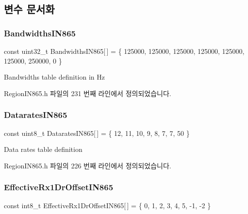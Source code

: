 \subsection{변수 문서화}
\mbox{\label{group___r_e_g_i_o_n_i_n865_ga475d37a30ba7948399a698e9ed6b8dc1}} 
\subsubsection{\texorpdfstring{Bandwidths\+I\+N865}{BandwidthsIN865}}
{\footnotesize\ttfamily const uint32\+\_\+t Bandwidths\+I\+N865\mbox{[}$\,$\mbox{]} = \{ 125000, 125000, 125000, 125000, 125000, 125000, 250000, 0 \}\hspace{0.3cm}{\ttfamily [static]}}

Bandwidths table definition in Hz 

Region\+I\+N865.\+h 파일의 231 번째 라인에서 정의되었습니다.

\mbox{\label{group___r_e_g_i_o_n_i_n865_gab75afc0ef0f385b2d600104b8c878015}} 
\subsubsection{\texorpdfstring{Datarates\+I\+N865}{DataratesIN865}}
{\footnotesize\ttfamily const uint8\+\_\+t Datarates\+I\+N865\mbox{[}$\,$\mbox{]} = \{ 12, 11, 10, 9, 8, 7, 7, 50 \}\hspace{0.3cm}{\ttfamily [static]}}

Data rates table definition 

Region\+I\+N865.\+h 파일의 226 번째 라인에서 정의되었습니다.

\mbox{\label{group___r_e_g_i_o_n_i_n865_ga3ea78d4c103e6cb89a5a573b0a3ae946}} 
\subsubsection{\texorpdfstring{Effective\+Rx1\+Dr\+Offset\+I\+N865}{EffectiveRx1DrOffsetIN865}}
{\footnotesize\ttfamily const int8\+\_\+t Effective\+Rx1\+Dr\+Offset\+I\+N865\mbox{[}$\,$\mbox{]} = \{ 0, 1, 2, 3, 4, 5, -\/1, -\/2 \}\hspace{0.3cm}{\ttfamily [static]}}

